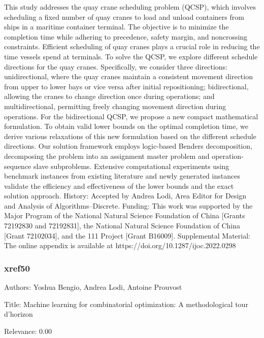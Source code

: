   This study addresses the quay crane scheduling problem (QCSP), which involves scheduling a fixed number of quay cranes to load and unload containers from ships in a maritime container terminal. The objective is to minimize the completion time while adhering to precedence, safety margin, and noncrossing constraints. Efficient scheduling of quay cranes plays a crucial role in reducing the time vessels spend at terminals. To solve the QCSP, we explore different schedule directions for the quay cranes. Specifically, we consider three directions: unidirectional, where the quay cranes maintain a consistent movement direction from upper to lower bays or vice versa after initial repositioning; bidirectional, allowing the cranes to change direction once during operations; and multidirectional, permitting freely changing movement direction during operations. For the bidirectional QCSP, we propose a new compact mathematical formulation. To obtain valid lower bounds on the optimal completion time, we derive various relaxations of this new formulation based on the different schedule directions. Our solution framework employs logic-based Benders decomposition, decomposing the problem into an assignment master problem and operation-sequence slave subproblems. Extensive computational experiments using benchmark instances from existing literature and newly generated instances validate the efficiency and effectiveness of the lower bounds and the exact solution approach.    History: Accepted by Andrea Lodi, Area Editor for Design  and  Analysis of Algorithms–Discrete.    Funding: This work was supported by the Major Program of the National Natural Science Foundation of China [Grants 72192830 and 72192831], the National Natural Science Foundation of China [Grant 72102034], and the 111 Project [Grant B16009].    Supplemental Material: The online appendix is available at https://doi.org/10.1287/ijoc.2022.0298  

\subsubsection{xref50}
\label{mw:xref50}

Authors: Yoshua Bengio, Andrea Lodi, Antoine Prouvost

Title: Machine learning for combinatorial optimization: A methodological tour d’horizon

Relevance:  0.00

